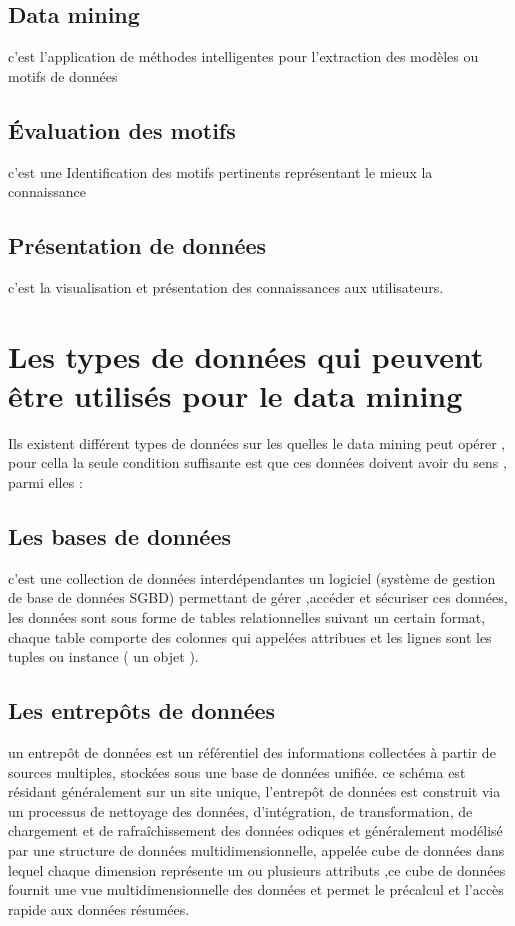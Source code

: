 \documentclass[12pt,a4paper,oneside]{book}
\begin{document}
	\subsection{Data mining}
	c'est l'application de méthodes intelligentes pour l'extraction des modèles ou motifs de données 
	\subsection{Évaluation des motifs}
	c'est une Identification des motifs pertinents représentant le mieux la connaissance
	
	\subsection{Présentation de données}
	c'est la visualisation et présentation des connaissances aux utilisateurs.
    \section{Les types de données qui peuvent être utilisés pour le data mining }
    Ils existent différent types de données sur les quelles le data mining peut opérer , pour cella la seule condition suffisante est que ces données doivent avoir du sens , parmi elles :
    \subsection{Les bases de données}
     c'est une collection de données interdépendantes  un logiciel  (système de gestion de base de données SGBD) permettant de gérer ,accéder et sécuriser ces données, les données sont sous forme de tables relationnelles  suivant un certain format, chaque table comporte des colonnes qui appelées attribues et les lignes sont les tuples  ou instance ( un objet ).
     
     
   \subsection{Les entrepôts de données}
   
   un entrepôt de données est un référentiel des informations collectées à partir de sources multiples, stockées sous une base de données unifiée.
   ce schéma est résidant généralement sur un site unique, l'entrepôt de données est construit via un processus de nettoyage des données, d’intégration, de transformation, de chargement et de
   rafraîchissement des données odiques et généralement modélisé par une structure de données multidimensionnelle, appelée
   cube de données
   dans lequel chaque
   dimension représente un ou plusieurs attributs ,ce cube de données fournit une vue multidimensionnelle des données et permet
   le précalcul et l'accès rapide aux données résumées.
\end{document}
